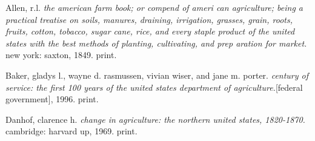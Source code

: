 \begin{workscited}

\bibent
Allen, r.l. \textit{the american farm book; or compend of ameri can agriculture; being a practical treatise on soils, manures, draining, irrigation, grasses, grain, roots, fruits, cotton, tobacco, sugar cane, rice, and every staple product of the united states with the best methods of planting, cultivating, and prep aration for market.} new york: saxton, 1849. print.

\bibent
Baker, gladys l., wayne d. rasmussen, vivian wiser, and jane m. porter. \textit{century of service: the first 100 years of the united states department of agriculture.}[federal government], 1996. print.

\bibent
Danhof, clarence h. \textit{change in agriculture: the northern united states, 1820-1870.} cambridge: harvard up, 1969. print.


\end{workscited}